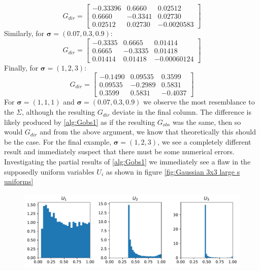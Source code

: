 \documentclass[../Thesis.tex]{subfiles}
\begin{document}
\begin{example}
\begin{equation}
        G_{dir} =
        \begin{bmatrix}
            -0.33396 & 0.6660  & 0.02512    \\
            0.6660   & -0.3341 & 0.02730    \\
            0.02512  & 0.02730 & -0.0020583
        \end{bmatrix}
    \end{equation}
    Similarly, for $\boldsymbol\sigma = (0.07, 0.3, 0.9)$:
    \begin{equation} \label{eq:s small G_dir}
        G_{dir} =
        \begin{bmatrix}
            -0.3335 & 0.6665  & 0.01414     \\
            0.6665  & -0.3335 & 0.01418     \\
            0.01414 & 0.01418 & -0.00060124
        \end{bmatrix}
    \end{equation}
    Finally, for $\boldsymbol\sigma = (1,2,3)$:
    $$ G_{dir} =
        \begin{bmatrix}
            -0.1490 & 0.09535 & 0.3599  \\
            0.09535 & -0.2989 & 0.5831  \\
            0.3599  & 0.5831  & -0.4037
        \end{bmatrix}
    $$
    For $\boldsymbol\sigma = (1,1,1)$ and $\boldsymbol\sigma = (0.07, 0.3, 0.9)$ we observe the most resemblance to the $\Sigma$, although the resulting $G_{dir}$ deviate in the final column. The difference is likely produced by \autoref{alg:Gobs1} as if the resulting $G_{obs}$ was the same, then so would $G_{dir}$ and from the above argument, we know that theoretically this should be the case. For the final example, $\boldsymbol\sigma = (1,2,3)$, we see a completely different result and immediately suspect that there must be some numerical errors. Investigating the partial results of \autoref{alg:Gobs1} we immediately see a flaw in the supposedly uniform variables $U_i$ as shown in figure \autoref{fig:Gaussian 3x3 large s uniforms}
    \begin{figure}[H]
        \centering
        \includegraphics[width=0.99\linewidth]{figures/ND examples/Gaussian 3x3 large s uniforms.pdf}

\end{figure}
\end{example}
\end{document}
